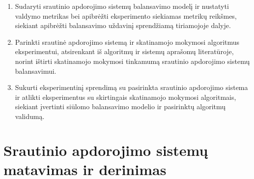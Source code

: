 \documentclass{VUMIFPSbakalaurinis}
\begin{document}
\begin{enumerate}
    \item Sudaryti srautinio apdorojimo sistemų balansavimo modelį ir nustatyti valdymo metrikas bei apibrėžti eksperimento siekiamas metrikų reikšmes, siekiant apibrėžti balansavimo uždavinį sprendžiamą tiriamojoje dalyje.
    \item Parinkti srautinė apdorojimo sistemą ir skatinamojo mokymosi algoritmus eksperimentui, atsirenkant iš algoritmų ir sistemų aprašomų literatūroje, norint ištirti skatinamojo mokymosi tinkamumą srautinio apdorojimo sistemų balansavimui.
    \item Sukurti eksperimentinį sprendimą su pasirinkta srautinio apdorojimo sistema ir atlikti eksperimentus su skirtingais skatinamojo mokymosi algoritmais, siekiant įvertinti siūlomo balansavimo modelio ir pasirinktų algoritmų validumą.
\end{enumerate}

\section{Srautinio apdorojimo sistemų matavimas ir derinimas}
\end{document}
